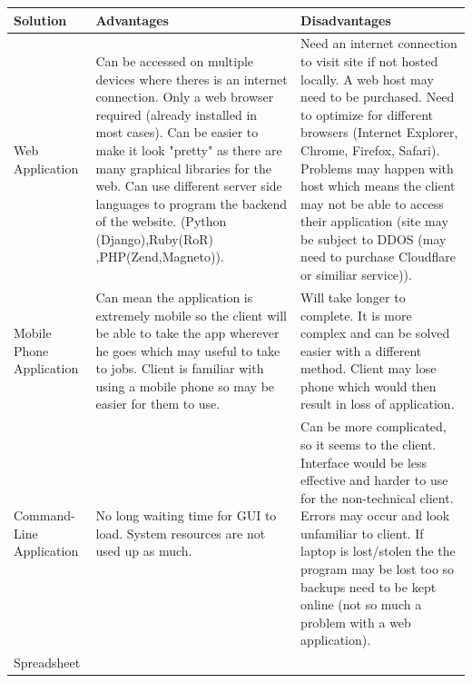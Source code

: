 \begin{flushleft}
\begin{longtable}{|p{3cm}|p{4cm}|p{4cm}|}
\hline
\textbf{Solution} & \textbf{Advantages} & \textbf{Disadvantages} \\ \hline

Web Application &

{Can be accessed on multiple devices where theres is an internet connection.
Only a web browser required (already installed in most cases).
Can be easier to make it look "pretty" as there are many graphical libraries for the web.
Can use different server side languages to program the backend of the website. (Python (Django),Ruby(RoR)
\linebreak
,PHP(Zend,Magneto)).}&

{Need an internet connection to visit site if not hosted locally.
A web host may need to be purchased.
Need to optimize for different browsers (Internet Explorer, Chrome, Firefox, Safari).
Problems may happen with host which means the client may not be able to access their application (site may be subject to DDOS (may need to purchase Cloudflare or similiar service))}.

\\ \hline

Mobile Phone Application &

Can mean the application is extremely mobile so the client will be able to take the app wherever he goes which may useful to take to jobs.
Client is familiar with using a mobile phone so may be easier for them to use.&

Will take longer to complete.
It is more complex and can be solved easier with a different method.
Client may lose phone which would then result in loss of application.

\\ \hline

Command-Line Application &

No long waiting time for GUI to load.
System resources are not used up as much. &


Can be more complicated, so it seems to the client.
Interface would be less effective and harder to use for the non-technical client.
Errors may occur and look unfamiliar to client.
If laptop is lost/stolen the the program may be lost too so backups need to be kept online (not so much a problem with a web application).

\\ \hline

Spreadsheet &


\end{longtable}
\end{flushleft}
